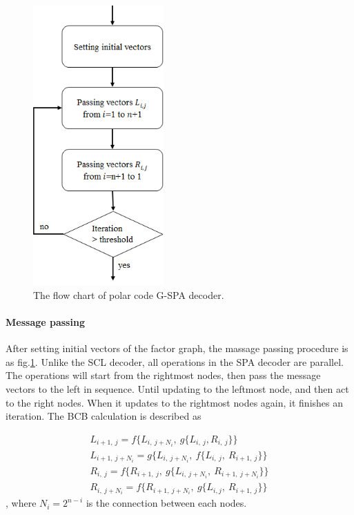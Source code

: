 \begin{figure}[t!]
 \centering
 \includegraphics[width=5cm]{fig/polar_gspa_flowchart.png}
 \caption{The flow chart of polar code G-SPA decoder.}
 \label{fig:polar_gspa_flowchat}
\end{figure}

\paragraph{Message passing}

	After setting initial vectors of the factor graph, the massage passing procedure is as fig.\ref{fig:polar_gspa_flowchat}. Unlike the SCL decoder, all operations in the SPA decoder are parallel. The operations will start from the rightmost nodes, then pass the message vectors to the left in sequence. Until updating to the leftmost node, and then act to the right nodes. When it updates to the rightmost nodes again, it finishes an iteration. The BCB calculation is described as

\begin{align}
L_{i+1,\ j} = f \{ L_{i, \ j + N_i}, \ g\{L_{i, \ j}, R_{i, \ j} \} \} \nonumber \\
L_{i+1, \ j+N_i} = g \{ L_{i, \ j + N_i}, \ f\{L_{i, \ j}, \  R_{i+1, \ j} \} \} \nonumber \\
R_{i, \ j} = f \{ R_{i+1, \ j}, \ g\{L_{i, \ j+N_i}, \ R_{i+1, \ j+N_i} \} \} \nonumber \\
R_{i, \ j+N_i} = f \{ R_{i+1, \ j+N_i}, \ g\{L_{i,j}, \ R_{i+1, \ j} \} \} 
\end{align}
, where $N_i=2^{n-i}$ is the connection between each nodes.


